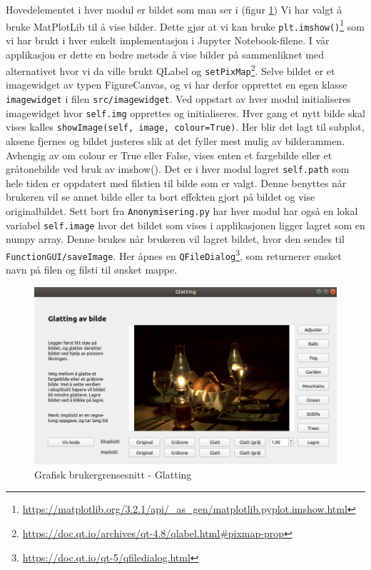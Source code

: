 Hovedelementet i hver modul er bildet som man ser i (figur \ref{fig:guiexample}) Vi har valgt å bruke MatPlotLib til å vise bilder. Dette gjør at vi kan bruke \texttt{plt.imshow()}\footnote{\url{https://matplotlib.org/3.2.1/api/_as_gen/matplotlib.pyplot.imshow.html}} som vi har brukt i hver enkelt implementasjon i Jupyter Notebook-filene. I vår applikasjon er dette en bedre metode å vise bilder på sammenliknet med alternativet hvor vi da ville brukt QLabel og \texttt{setPixMap}\footnote{\url{https://doc.qt.io/archives/qt-4.8/qlabel.html#pixmap-prop}}. Selve bildet er et imagewidget av typen FigureCanvas, og vi har derfor opprettet en egen klasse \texttt {imagewidget} i filen \texttt{src/imagewidget}. Ved oppstart av hver modul initialiseres imagewidget hvor \texttt{self.img} opprettes og initialiseres. Hver gang et nytt bilde skal vises kalles \texttt{showImage(self, image, colour=True)}. Her blir det lagt til subplot, aksene fjernes og bildet justeres slik at det fyller mest mulig av bilderammen. Avhengig av om colour er True eller False, vises enten et fargebilde eller et gråtonebilde ved bruk av imshow(). Det er i hver modul lagret \texttt{self.path} som hele tiden er oppdatert med filstien til bilde som er valgt. Denne benyttes når brukeren vil se annet bilde eller ta bort effekten gjort på bildet og vise originalbildet. Sett bort fra \texttt{Anonymisering.py} har hver modul har også en lokal variabel \texttt{self.image} hvor det bildet som vises i applikasjonen ligger lagret som en numpy array. Denne brukes når brukeren vil lagret bildet, hvor den sendes til \texttt{FunctionGUI/saveImage}. Her åpnes en \texttt{QFileDialog}\footnote{\url{https://doc.qt.io/qt-5/qfiledialog.html}}, som returnerer ønsket navn på filen og filsti til ønsket mappe.

\begin{figure}
\begin{center}
    \includegraphics[width=0.8\columnwidth]{bilder/Gui/guiexample.jpg}
     \caption{Grafisk brukergrensesnitt - Glatting \label{fig:guiexample}}
\end{center}
\end{figure}

